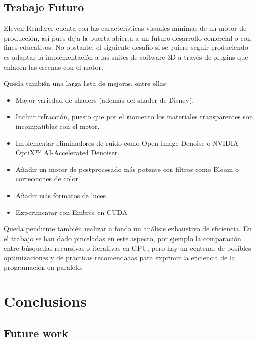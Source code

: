 
\section{Trabajo Futuro}
	
Eleven Renderer cuenta con las características visuales mínimas de un motor de producción, así pues deja la puerta abierta a un futuro desarrollo comercial o con fines educativos. No obstante, el siguiente desafío si se quiere seguir produciendo es adaptar la implementación a las suites de software 3D a través de plugins que enlacen las escenas con el motor. 

Queda también una larga lista de mejoras, entre ellas:

\begin{itemize}
	
	\item Mayor variedad de shaders (además del shader de Disney).
	\item Incluir refracción, puesto que por el momento los materiales transparentes son incompatibles con el motor.
	\item Implementar eliminadores de ruido como Open Image Denoise o NVIDIA OptiX™ AI-Accelerated Denoiser.
	\item Añadir un motor de postprocesado más potente con filtros como Bloom o correcciones de color
	\item Añadir más formatos de luces
	\item Experimentar con Embree en CUDA
	
\end{itemize}

Queda pendiente también realizar a fondo un análisis exhaustivo de eficiencia. En el trabajo se han dado pinceladas en este aspecto, por ejemplo la comparación entre búsquedas recursivas o iterativas en GPU, pero hay un centenar de posibles optimizaciones y de prácticas recomendadas para exprimir la eficiencia de la programación en paralelo.

\chapter*{Conclusions}


\section{Future work}
	
